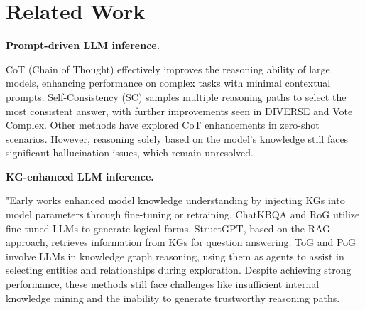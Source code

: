 \section{Related Work}

\textbf{Prompt-driven LLM inference.}

CoT\cite{cot} (Chain of Thought) effectively improves the reasoning ability of large models, enhancing performance on complex tasks with minimal contextual prompts. Self-Consistency (SC)\cite{sc} samples multiple reasoning paths to select the most consistent answer, with further improvements seen in DIVERSE\cite{cot-more-1} and Vote Complex\cite{cot-more-2}. Other methods have explored CoT enhancements in zero-shot scenarios\cite{zero1,zero2}. However, reasoning solely based on the model's knowledge still faces significant hallucination issues, which remain unresolved.

\textbf{KG-enhanced LLM inference.}

"Early works enhanced model knowledge understanding by injecting KGs into model parameters through fine-tuning or retraining\cite{re-kbqa,unikgqa,givefact}. ChatKBQA\cite{chatkbqa} and RoG\cite{rog} utilize fine-tuned LLMs to generate logical forms. StructGPT\cite{structgpt}, based on the RAG approach, retrieves information from KGs for question answering. ToG\cite{tog} and PoG\cite{pog} involve LLMs in knowledge graph reasoning, using them as agents to assist in selecting entities and relationships during exploration. Despite achieving strong performance, these methods still face challenges like insufficient internal knowledge mining and the inability to generate trustworthy reasoning paths.
